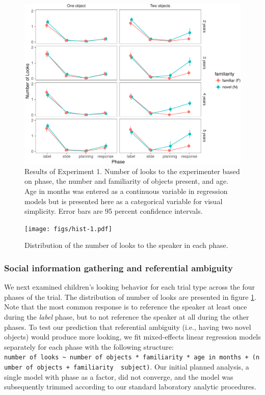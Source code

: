 \documentclass[english,man]{apa6}
\theoremstyle{definition}
\theoremstyle{definition}
\theoremstyle{definition}
\theoremstyle{remark}
\begin{document}
\begin{figure}
\centering
\includegraphics{figs/resultse1-1.pdf}
\caption{\label{fig:resultse1}Results of Experiment 1. Number of looks to
the experimenter based on phase, the number and familiarity of objects
present, and age. Age in months was entered as a continuous variable in
regression models but is presented here as a categorical variable for
visual simplicity. Error bars are 95 percent confidence intervals.}
\end{figure}

\begin{figure}
\centering
\texttt{[image: figs/hist-1.pdf]}
\caption{\label{fig:hist}Distribution of the number of looks to the speaker
in each phase.}
\end{figure}

\subsubsection{Social information gathering and referential
ambiguity}\label{social-information-gathering-and-referential-ambiguity}

We next examined children's looking behavior for each trial type across
the four phases of the trial. The distribution of number of looks are
presented in figure \ref{fig:resultse1}. Note that the most common
response is to reference the speaker at least once during the
\emph{label} phase, but to not reference the speaker at all during the
other phases. To test our prediction that referential ambiguity (i.e.,
having two novel objects) would produce more looking, we fit
mixed-effects linear regression models separately for each phase with
the following structure:
\texttt{number\ of\ looks\ \textasciitilde{}\ number\ of\ objects\ *\ familiarity\ *\ age\ in\ months\ +\ (number\ of\ objects\ +\ familiarity\ \textbar{}\ subject)}.
Our initial planned analysis, a single model with phase as a factor, did
not converge, and the model was subsequently trimmed according to our
standard laboratory analytic procedures.
\end{document}
